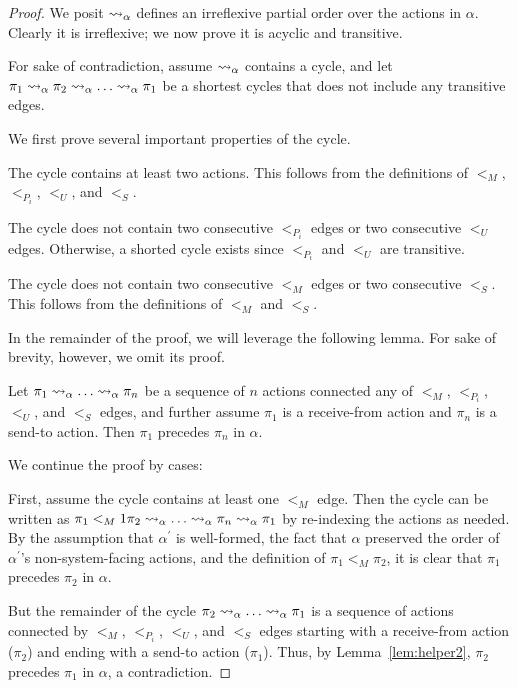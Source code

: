 \begin{proof}
We posit $\rightsquigarrow_{\alpha}$ defines an irreflexive partial order over the actions
in $\alpha$. Clearly it is irreflexive; we now prove it is acyclic and transitive.

For sake of contradiction, assume $\rightsquigarrow_{\alpha}$ contains a cycle, and
let $\pi_1 \rightsquigarrow_{\alpha} \pi_2 \rightsquigarrow_{\alpha} \ldots \rightsquigarrow_{\alpha} \pi_1$
be a shortest cycles that does not include any transitive edges.

We first prove several important properties of the cycle.

 The cycle contains at least two actions.
This follows from the definitions of $<_M$, $<_{P_i}$, $<_U$, and $<_S$.

 The cycle does not contain two consecutive
$<_{P_i}$ edges or two consecutive $<_U$ edges. Otherwise, a shorted cycle
exists since $<_{P_i}$ and $<_U$ are transitive.

 The cycle does not contain two consecutive
$<_M$ edges or two consecutive $<_S$. This follows from the definitions of
$<_M$ and $<_S$.

In the remainder of the proof, we will leverage the following lemma. For
sake of brevity, however, we omit its proof.

\begin{lem}
    Let $\pi_1 \rightsquigarrow_{\alpha} \ldots \rightsquigarrow_{\alpha} \pi_n$
    be a sequence of $n$ actions connected any of $<_M$, $<_{P_i}$, $<_U$,
    and $<_S$ edges, and further assume $\pi_1$ is a receive-from action
    and $\pi_n$ is a send-to action. Then $\pi_1$ precedes $\pi_n$ in $\alpha$.
    \label{lem:helper2}
\end{lem}

We continue the proof by cases:

First, assume the cycle contains at least one $<_M$ edge. Then the cycle can be written as
$\pi_1 <_M1 \pi_2 \rightsquigarrow_{\alpha} \ldots \rightsquigarrow_{\alpha} \pi_n \rightsquigarrow_{\alpha} \pi_1$ 
by re-indexing the actions as needed. By the assumption that $\alpha^\prime$ is well-formed,
the fact that $\alpha$ preserved the order of $\alpha^\prime$'s non-system-facing actions,
and the definition of $\pi_1 <_M \pi_2$, it is clear that $\pi_1$ precedes $\pi_2$ in $\alpha$.

But the remainder of the cycle
$\pi_2 \rightsquigarrow_{\alpha} \ldots \rightsquigarrow_{\alpha} \pi_1$
is a sequence of actions connected by $<_M$, $<_{P_i}$, $<_U$, and $<_S$ edges
starting with a receive-from action ($\pi_2$) and ending with a send-to action
($\pi_1$). Thus, by Lemma~\ref{lem:helper2}, $\pi_2$ precedes $\pi_1$ in $\alpha$,
a contradiction.


\end{proof}
